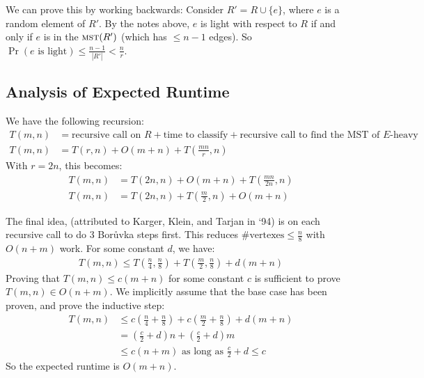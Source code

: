                     We can prove this by working backwards:
                    Consider $R' = R \cup \{e\}$, where $e$ is a random element of $R'$.
                    By the notes above, $e$ is light with respect to $R$ if and only if $e$ is in the $\textsc{mst}(R')$ (which has $\le n-1$ edges).
                    So $\Pr(\text{$e$ is light}) \le \frac{n-1}{|R'|} < \frac{n}{r}$.
                \subsection{Analysis of Expected Runtime} %
                \label{sub:analysis_of_expected_runtime}
                    We have the following recursion:
                    \begin{align*}
                        T(m, n) &= \text{recursive call on $R$} + \text{time to classify} + \text{recursive call to find the MST of $E$-heavy} \\
                        T(m, n) &= T(r, n) + O(m + n) + T\left(\frac{mn}{r}, n\right)
                    \end{align*}
                    With $r = 2n$, this becomes:
                    \begin{align*}
                        T(m, n) &= T(2n, n) + O(m + n) + T\left(\frac{mn}{2n}, n\right) \\
                        T(m, n) &= T(2n, n) + T\left(\frac{m}{2}, n\right) + O(m + n)
                    \end{align*}

                    The final idea, (attributed to Karger, Klein, and Tarjan in `94) is on each recursive call to do 3 Bor\r{u}vka steps first.
                    This reduces $\text{\# vertexes} \le \frac{n}{8}$ with $O(n + m)$ work.
                    For some constant $d$, we have:
                    \begin{align*}
                        T(m, n) \le T\left(\frac{n}{4}, \frac{n}{8}\right) + T\left(\frac{m}{2}, \frac{n}{8}\right) + d(m+n)
                    \end{align*}
                    Proving that $T(m, n) \le c(m + n)$ for some constant $c$ is sufficient to prove $T(m, n) \in O(n + m)$.
                    We implicitly assume that the base case has been proven, and prove the inductive step:
                    \begin{align*}
                        T(m, n) &\le c\left(\frac{n}{4} + \frac{n}{8}\right) + c\left(\frac{m}{2} + \frac{n}{8}\right) + d\left(m + n\right) \\
                                &= \left(\frac{c}{2} + d\right) n + \left(\frac{c}{2} + d \right) m \\
                                &\le c(n+m) \text{ as long as $\frac{c}{2} + d \le c$}
                    \end{align*}
                    So the expected runtime is $O(m+n)$.

